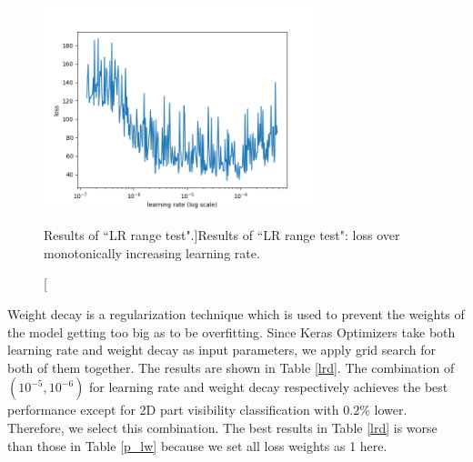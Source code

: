 \documentclass[a4paper,12pt]{article}
\begin{document}
\begin{figure}[H]		
	\includegraphics[width=0.7\textwidth]{LR_range_test.png}
	\caption[Results of ``LR range test".]{Results of ``LR range test": loss over monotonically increasing learning rate. }
	\centering
	\label{figure:lr_test}
\end{figure}

Weight decay is a regularization technique which is used to prevent the weights of the model getting too big as to be overfitting. Since Keras Optimizers \cite{chollet2015keras} take both learning rate and weight decay as input parameters, we apply grid search for both of them together. The results are shown in Table \ref{lrd}. The combination of $(10^{-5}, 10^{-6})$ for learning rate and weight decay respectively achieves the best performance except for 2D part visibility classification with $0.2\%$ lower. Therefore, we select this combination. The best results in Table \ref{lrd} is worse than those in Table \ref{p_lw} because we set all loss weights as 1 here. 
\end{document}
